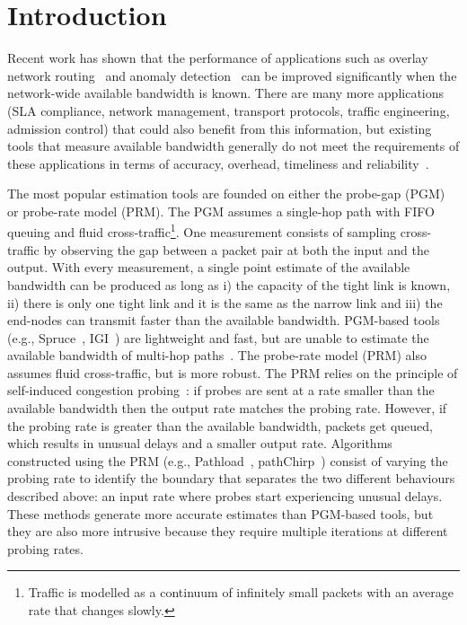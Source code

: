 \documentclass[final,5p,times,twocolumn]{elsarticle}
\begin{document}
\section{Introduction}
\label{sec:intro}

Recent work has shown that the performance of applications such as overlay network routing~\cite{hir:07,lee:08} and anomaly detection~\cite{he:08anomaly} can be improved significantly when the network-wide available bandwidth is known.  There are many more applications (SLA compliance, network management, transport protocols, traffic engineering, admission control) that could also benefit from this information, but existing tools that measure available bandwidth generally do not meet the requirements of these applications in terms of accuracy, overhead, timeliness and reliability~\cite{gue:09applicability}.  

The most popular estimation tools are founded on either the probe-gap (PGM) or probe-rate model (PRM).  The PGM assumes a single-hop path with FIFO queuing and fluid cross-traffic\footnote{Traffic is modelled as a continuum of infinitely small packets with an average rate that changes slowly.}.  One measurement consists of sampling cross-traffic by observing the gap between a packet pair at both the input and the output.  With every measurement, a single point estimate of the available bandwidth can be produced as long as i) the capacity of the tight link is known, ii) there is only one tight link and it is the same as the narrow link and iii) the end-nodes can transmit faster than the available bandwidth.  PGM-based tools (e.g., Spruce~\cite{str:03}, IGI~\cite{hu:03}) are lightweight and fast, but are unable to estimate the available bandwidth of multi-hop paths~\cite{lao:06}.  
The probe-rate model (PRM) also assumes fluid cross-traffic, but is more robust.
The PRM relies on the principle of self-induced congestion probing~\cite{rib:03}: if probes are sent at a rate smaller than the available bandwidth then the output rate matches the probing rate.  However, if the probing rate is greater than the available bandwidth, packets get queued, which results in unusual delays and a smaller output rate.  Algorithms constructed using the PRM (e.g., Pathload~\cite{jai:03}, pathChirp~\cite{rib:03}) consist of varying the probing rate to identify the boundary that separates the two different behaviours described above: an input rate where probes start experiencing unusual delays.  These methods generate more accurate estimates than PGM-based tools, but they are also more intrusive because they require multiple iterations at different probing rates.
\end{document}
